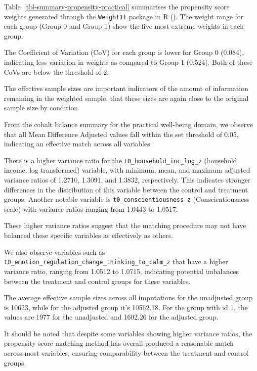 \documentclass[
  singlecolumn,
  9pt]{article}
\begin{document}
Table~\ref{tbl-summary-propensity-practical} summarises the propensity
score weights generated through the \texttt{WeightIt} package in R
(). The weight
range for each group (Group 0 and Group 1) show the five most extreme
weights in each group.

The Coefficient of Variation (CoV) for each group is lower for Group 0
(0.084), indicating less variation in weights as compared to Group 1
(0.524). Both of these CoVs are below the threshold of 2.

The effective sample sizes are important indicators of the amount of
information remaining in the weighted sample, that these sizes are again
close to the original sample size by condition.

From the cobalt balance summary for the practical well-being domain, we
observe that all Mean Difference Adjusted values fall within the set
threshold of 0.05, indicating an effective match across all variables.

There is a higher variance ratio for the
\texttt{t0\_household\_inc\_log\_z} (household income, log transformed)
variable, with minimum, mean, and maximum adjusted variance ratios of
1.2710, 1.3091, and 1.3832, respectively. This indicates stronger
differences in the distribution of this variable between the control and
treatment groups. Another notable variable is
\texttt{t0\_conscientiousness\_z} (Conscientiousness scale) with
variance ratios ranging from 1.0443 to 1.0517.

These higher variance ratios suggest that the matching procedure may not
have balanced these specific variables as effectively as others.

We also observe variables such as
\texttt{t0\_emotion\_regulation\_change\_thinking\_to\_calm\_z} that
have a higher variance ratio, ranging from 1.0512 to 1.0715, indicating
potential imbalances between the treatment and control groups for these
variables.

The average effective sample sizes across all imputations for the
unadjusted group is 10623, while for the adjusted group it's 10562.18.
For the group with id 1, the values are 1977 for the unadjusted and
1602.26 for the adjusted group.

It should be noted that despite some variables showing higher variance
ratios, the propensity score matching method has overall produced a
reasonable match across most variables, ensuring comparability between
the treatment and control groups.
\end{document}
